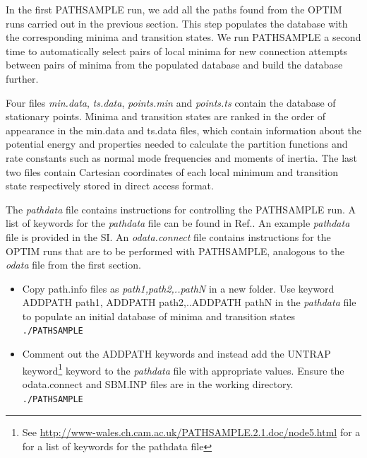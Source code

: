 \documentclass[journal=jacsat]{achemso}
\begin{document}
In the first PATHSAMPLE run, we add all the paths found from the  OPTIM runs carried out in the previous section. This step populates the database with the corresponding minima and transition states. We run PATHSAMPLE a second time to automatically select pairs of local minima for new connection attempts between pairs of minima from the populated database and build the database further. 

Four files \emph{min.data}, \emph{ts.data}, \emph{points.min} and \emph{points.ts} contain the database of stationary points. Minima and transition states are ranked in the order of appearance in the min.data and ts.data files, which contain information about the potential energy and properties needed to calculate the partition functions and rate constants such as normal mode frequencies and moments of inertia. The last two files contain Cartesian coordinates of each local minimum and transition state respectively stored in direct access format. 

The \emph{pathdata} file contains instructions for controlling the PATHSAMPLE run. A list of keywords for the \emph{pathdata} file can be found in Ref.\cite{PATHSAMPLE}. An example \emph{pathdata} file is provided in the SI. An \emph{odata.connect} file contains instructions for the OPTIM runs that are to be performed with PATHSAMPLE, analogous to the \emph{odata} file from the first section.

\begin{itemize}
    \item {Copy path.info files as \emph{path1,path2,..pathN} in a new folder. Use keyword ADDPATH path1, ADDPATH path2,..ADDPATH pathN in the \emph{pathdata} file to populate an initial database of minima and transition states\\  \tt{./PATHSAMPLE}}
    \item {Comment out the ADDPATH keywords and instead add the UNTRAP keyword\footnote{See \url{http://www-wales.ch.cam.ac.uk/PATHSAMPLE.2.1.doc/node5.html} for a for a list of keywords for the pathdata file} keyword to the \emph{pathdata} file with appropriate values. Ensure the odata.connect and SBM.INP files are in the working directory. \\ \tt{./PATHSAMPLE}}
\end{itemize}
\end{document}
